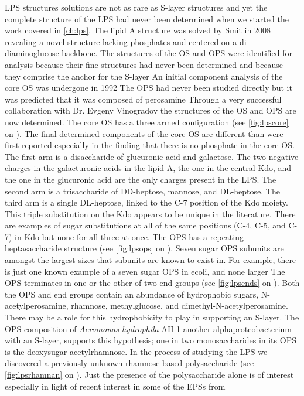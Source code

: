 \ac{LPS} structures solutions are not as rare as \ac{S-layer} structures and yet the complete structure of the \caulobacter{} \ac{LPS} had never been determined when we started the work covered in \cref{ch:lps}. The \caulobacter{} lipid A structure was solved by Smit \etal{} in 2008 revealing a novel structure lacking phosphates and centered on a di-diaminoglucose backbone. The structures of the \ac{OS} and \ac{OPS} were identified for analysis because their fine structures had never been determined and because they comprise the anchor for the \caulobacter{} \ac{S-layer} An initial component analysis of the core \ac{OS} was undergone in 1992 The \ac{OPS} had never been studied directly but it was predicted that it was composed of perosamine Through a very successful collaboration with Dr. Evgeny Vinogradov the structures of the \caulobacter{} \ac{OS} and \ac{OPS} are now determined. The core \ac{OS} has a three armed configuration (see \cref{fig:lpscore} on ). The final determined components of the core \ac{OS} are different than were first reported especially in the finding that there is no phosphate in the core \ac{OS}. The first arm is a disaccharide of glucuronic acid and galactose. The two negative charges in the galacturonic acids in the lipid A, the one in the central Kdo, and the one in the glucuronic acid are the only charges present in the \caulobacter{} \ac{LPS}. The second arm is a trisaccharide of DD-heptose, mannose, and DL-heptose. The third arm is a single DL-heptose, linked to the C-7 position of the Kdo moiety. This triple substitution on the Kdo appears to be unique in the literature. There are examples of sugar substitutions at all of the same positions (C-4, C-5, and C-7) in Kdo but none for all three at once. The \ac{OPS} has a repeating heptasaccharide structure (see \cref{fig:lpsops} on ). Seven sugar \ac{OPS} subunits are amongst the largest sizes that subunits are known to exist in. For example, there is just one known example of a seven sugar \ac{OPS} in \acl{ecoli}, and none larger The \caulobacter{} \ac{OPS} terminates in one or the other of two end groups (see \cref{fig:lpsends} on ). Both the \ac{OPS} and end groups contain an abundance of hydrophobic sugars, \ie N-acetylperosamine, rhamnose, methylglucose, and dimethyl-N-acetylperosamine. There may be a role for this hydrophobicity to play in supporting an \ac{S-layer}. The \ac{OPS} composition of \textit{Aeromonas hydrophila} AH-1 another alphaproteobacterium with an \ac{S-layer}, supports this hypothesis; one in two monosaccharides in its \ac{OPS} is the deoxysugar acetylrhamnose. In the process of studying the \caulobacter{} \ac{LPS} we discovered a previously unknown rhamnose based polysaccharide (see \cref{fig:lpsrhamnan} on ). Just the presence of the polysaccharide alone is of interest especially in light of recent interest in some of the \acp{EPS} from \caulobacter{}  

